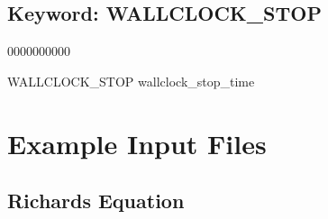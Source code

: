 \documentclass[12pt]{article}
\begin{document}

\newpage
\protect\hypertarget{target_wallclk}{}

\subsection{Keyword: WALLCLOCK\_STOP}
\begin{deflist}{0000000000}
\item[WALLCLOCK\_STOP] wallclock\_stop\_time
\end{deflist}



\newpage
\section{Example Input Files}

\subsection{Richards Equation}
\end{document}
